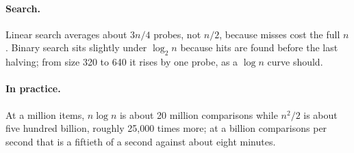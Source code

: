 \documentclass[11pt]{article}
\begin{document}
\paragraph{Search.} Linear search averages about $3n/4$ probes, not $n/2$, because misses cost the full $n$. Binary search sits slightly under $\log_2 n$ because hits are found before the last halving; from size 320 to 640 it rises by one probe, as a $\log n$ curve should.

\paragraph{In practice.} At a million items, $n \log n$ is about 20 million comparisons while $n^2/2$ is about five hundred billion, roughly 25{,}000 times more; at a billion comparisons per second that is a fiftieth of a second against about eight minutes.
\end{document}
